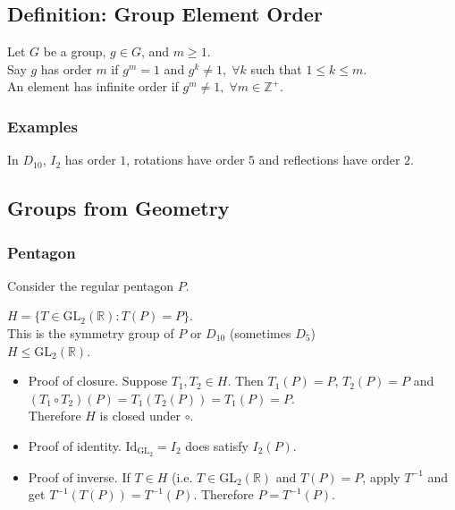 \documentclass[11pt]{article}
\newcommand{\0}{\emptyset}
\newcommand{\Z}{\mathbb{Z}}
\newcommand{\R}{\mathbb{R}}
\begin{document}
\subsection*{Definition: Group Element Order}
\label{sec:org4f12744}
Let \(G\) be a group, \(g\in G\), and \(m\geq 1\).\\[0pt]
Say \(g\) has order \(m\) if \(g^{m}=1\) and \(g^{k}\neq 1,\;\forall k\) such that \(1\leq k\leq m\).\\[0pt]
An element has infinite order if \(g^{m}\neq1,\;\forall m\in\Z^{+}\).\\[0pt]
\subsubsection*{Examples}
\label{sec:org8ce99d3}
In \(D_{10}\), \(I_{2}\) has order \(1\), rotations have order \(5\) and reflections have order \(2\).\\[0pt]
\subsection*{Groups from Geometry}
\label{sec:org6c1c828}
\subsubsection*{Pentagon}
\label{sec:orge999589}
Consider the regular pentagon \(P\).\\[0pt]


\(H=\{T\in\text{GL}_{2}(\R):T(P)=P\}\).\\[0pt]
This is the symmetry group of \(P\) or \(D_{10}\) (sometimes \(D_{5}\))\\[0pt]
\(H\leq\text{GL}_{2}(\R)\).\\[0pt]
\begin{itemize}
\item Proof of closure.
\label{sec:org94124ec}
Suppose \(T_{1},T_{2}\in H\). Then \(T_{1}(P)=P\), \(T_{2}(P)=P\) and \((T_{1}\circ T_{2})(P)=T_{1}(T_{2}(P))=T_{1}(P)=P\).\\[0pt]
Therefore \(H\) is closed under \(\circ\).\\[0pt]
\item Proof of identity.
\label{sec:orgb33cead}
\(\text{Id}_{\text{GL}_{2}}=I_{2}\) does satisfy \(I_{2}(P)\).\\[0pt]
\item Proof of inverse.
\label{sec:org0d8c94a}
If \(T\in H\) (i.e. \(T\in\text{GL}_{2}(\R)\) and \(T(P)=P\), apply \(T^{-1}\) and get \(T^{-1}(T(P))=T^{-1}(P)\). Therefore \(P=T^{-1}(P)\).\\[0pt]
\end{itemize}
\end{document}
